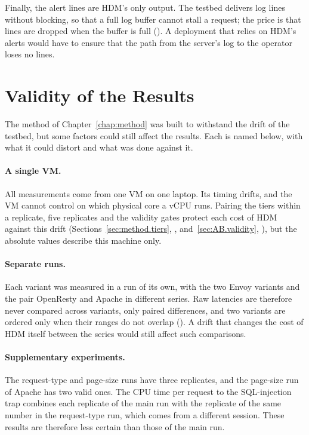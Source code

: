 \documentclass{rptuma}
\begin{document}
Finally, the alert lines are HDM's only output. The testbed delivers log lines without blocking, so
that a full log buffer cannot stall a request; the price is that lines are dropped when the buffer
is full (). A deployment that relies on HDM's alerts would have to
ensure that the path from the server's log to the operator loses no lines.

\section{Validity of the Results}
\label{sec:disc.threats}

The method of Chapter~\ref{chap:method} was built to withstand the drift of the testbed, but some factors could still affect the results. Each is named below, with what it could distort and what was done against it.

\paragraph{A single VM.} All measurements come from one VM on one laptop. Its timing
drifts, and the VM cannot control on which physical core a vCPU runs. Pairing the tiers within a
replicate, five replicates and the validity gates protect each cost of HDM against this drift
(Sections~\ref{sec:method.tiers}, \emph{}, and~\ref{sec:AB.validity},
\emph{}), but the absolute values describe this machine only.

\paragraph{Separate runs.} Each variant was measured in a run of its own, with the two Envoy
variants and the pair OpenResty and Apache in different series. Raw latencies are
therefore never compared across variants, only paired differences, and two variants are ordered
only when their ranges do not overlap (). A drift that changes the cost
of HDM itself between the series would still affect such comparisons.

\paragraph{Supplementary experiments.} The request-type and page-size runs have three replicates,
and the page-size run of Apache has two valid ones. The CPU time per request to the SQL-injection
trap combines each replicate of the main run with the replicate of the same number in the
request-type run, which comes from a different session. These results are therefore less certain
than those of the main run.
\end{document}
